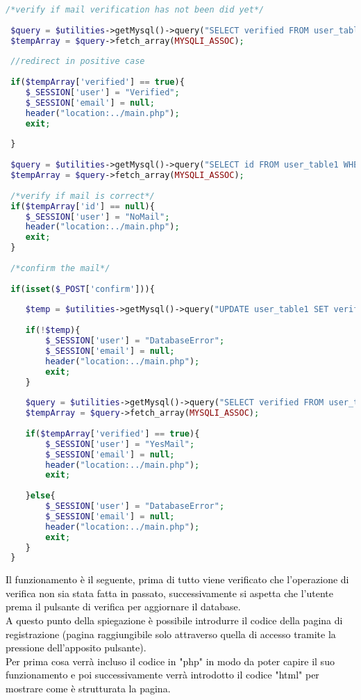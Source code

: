  \begin{lstlisting}[language=php]
 /*verify if mail verification has not been did yet*/
 
 $query = $utilities->getMysql()->query("SELECT verified FROM user_table1 WHERE (email = '{$_SESSION['email']}')");
 $tempArray = $query->fetch_array(MYSQLI_ASSOC);
 
 //redirect in positive case
 
 if($tempArray['verified'] == true){
 	$_SESSION['user'] = "Verified";
 	$_SESSION['email'] = null;
 	header("location:../main.php");
 	exit;
 	
 }
 
 $query = $utilities->getMysql()->query("SELECT id FROM user_table1 WHERE (email = '{$_SESSION['email']}')");
 $tempArray = $query->fetch_array(MYSQLI_ASSOC);
 
 /*verify if mail is correct*/
 if($tempArray['id'] == null){
 	$_SESSION['user'] = "NoMail";
 	header("location:../main.php");
 	exit;
 }
 
 /*confirm the mail*/
 
 if(isset($_POST['confirm'])){
 	
 	$temp = $utilities->getMysql()->query("UPDATE user_table1 SET verified = 1 WHERE (id = '{$tempArray['id']}')");
 	
 	if(!$temp){
 		$_SESSION['user'] = "DatabaseError";
 		$_SESSION['email'] = null;
 		header("location:../main.php");
 		exit;
 	}
 	
 	$query = $utilities->getMysql()->query("SELECT verified FROM user_table1 WHERE (email = '{$_SESSION['email']}')");
 	$tempArray = $query->fetch_array(MYSQLI_ASSOC);
 	
 	if($tempArray['verified'] == true){
 		$_SESSION['user'] = "YesMail";
 		$_SESSION['email'] = null;
 		header("location:../main.php");
 		exit;
 		
 	}else{
 		$_SESSION['user'] = "DatabaseError";
 		$_SESSION['email'] = null;
 		header("location:../main.php");
 		exit;
 	}
 }
 \end{lstlisting}
 
 \textcolor{black}{Il funzionamento è il seguente,  prima di tutto viene verificato che l'operazione di verifica non sia stata fatta in passato, successivamente si aspetta che l'utente prema il pulsante di verifica per aggiornare il database.} \bigskip\\

 \textcolor{black}{A questo punto della spiegazione è possibile introdurre il codice della pagina di registrazione (pagina raggiungibile solo attraverso quella di accesso tramite la pressione dell'apposito pulsante).\\
 Per prima cosa verrà incluso il codice in "php" in modo da poter capire il suo funzionamento e poi successivamente verrà introdotto il codice "html" per mostrare come è strutturata la pagina.}\\
 
